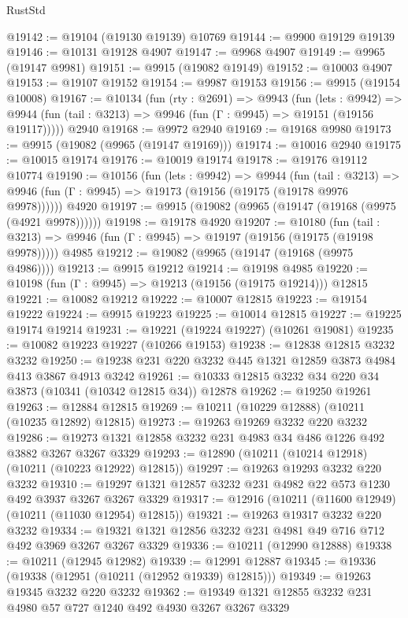 \begin{lexlean}{RustStd}
\begin{coremodule}
{\begin{coremodule}
{{{{{{{{{{{{{{{{{{{{{{{{{@19142 := @19104 (@19130 @19139) @10769
@19144 := @9900 @19129 @19139
@19146 := @10131 @19128 @4907
@19147 := @9968 @4907
@19149 := @9965 (@19147 @9981)
@19151 := @9915 (@19082 @19149)
@19152 := @10003 @4907
@19153 := @19107 @19152
@19154 := @9987 @19153
@19156 := @9915 (@19154 @10008)
@19167 := @10134
    (fun (rty : @2691) =>
    @9943
      (fun (lets : @9942) =>
      @9944 (fun (tail : @3213) => @9946 (fun (Γ : @9945) => @19151 (@19156 @19117)))))
    @2940
@19168 := @9972 @2940
@19169 := @19168 @9980
@19173 := @9915 (@19082 (@9965 (@19147 @19169)))
@19174 := @10016 @2940
@19175 := @10015 @19174
@19176 := @10019 @19174
@19178 := @19176 @19112 @10774
@19190 := @10156
    (fun (lets : @9942) =>
    @9944
      (fun (tail : @3213) =>
      @9946 (fun (Γ : @9945) => @19173 (@19156 (@19175 (@19178 @9976 @9978))))))
    @4920
@19197 := @9915 (@19082 (@9965 (@19147 (@19168 (@9975 (@4921 @9978))))))
@19198 := @19178 @4920
@19207 := @10180
    (fun (tail : @3213) => @9946 (fun (Γ : @9945) => @19197 (@19156 (@19175 (@19198 @9978)))))
    @4985
@19212 := @19082 (@9965 (@19147 (@19168 (@9975 @4986))))
@19213 := @9915 @19212
@19214 := @19198 @4985
@19220 := @10198 (fun (Γ : @9945) => @19213 (@19156 (@19175 @19214))) @12815
@19221 := @10082 @19212
@19222 := @10007 @12815
@19223 := @19154 @19222
@19224 := @9915 @19223
@19225 := @10014 @12815
@19227 := @19225 @19174 @19214
@19231 := @19221 (@19224 @19227) (@10261 @19081)
@19235 := @10082 @19223 @19227 (@10266 @19153)
@19238 := @12838 @12815 @3232 @3232
@19250 := @19238 @231 @220 @3232 @445 @1321 @12859 @3873 @4984 @413 @3867 @4913 @3242
@19261 := @10333 @12815 @3232 @34 @220 @34 @3873 (@10341 (@10342 @12815 @34)) @12878
@19262 := @19250 @19261
@19263 := @12884 @12815
@19269 := @10211 (@10229 @12888) (@10211 (@10235 @12892) @12815)
@19273 := @19263 @19269 @3232 @220 @3232
@19286 := @19273 @1321 @12858 @3232 @231 @4983 @34 @486 @1226 @492 @3882 @3267 @3267 @3329
@19293 := @12890 (@10211 (@10214 @12918) (@10211 (@10223 @12922) @12815))
@19297 := @19263 @19293 @3232 @220 @3232
@19310 := @19297 @1321 @12857 @3232 @231 @4982 @22 @573 @1230 @492 @3937 @3267 @3267 @3329
@19317 := @12916 (@10211 (@11600 @12949) (@10211 (@11030 @12954) @12815))
@19321 := @19263 @19317 @3232 @220 @3232
@19334 := @19321 @1321 @12856 @3232 @231 @4981 @49 @716 @712 @492 @3969 @3267 @3267 @3329
@19336 := @10211 (@12990 @12888)
@19338 := @10211 (@12945 @12982)
@19339 := @12991 @12887
@19345 := @19336 (@19338 (@12951 (@10211 (@12952 @19339) @12815)))
@19349 := @19263 @19345 @3232 @220 @3232
@19362 := @19349 @1321 @12855 @3232 @231 @4980 @57 @727 @1240 @492 @4930 @3267 @3267 @3329
}}}}}}}}}}}}}}}}}}}}}}}}}
\end{coremodule}}
\end{coremodule}
\end{lexlean}
